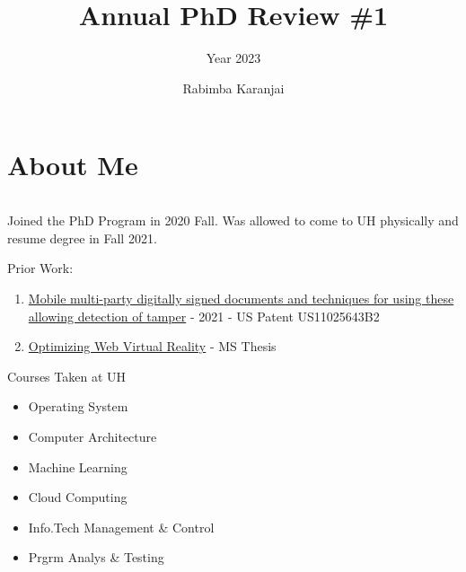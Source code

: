 \documentclass[10pt,aspectratio=169]{beamer}
\title{Annual PhD Review \#1}
\subtitle{Year 2023}
\author{Rabimba Karanjai}
\begin{document}
\maketitle

\section[fragile]{About Me}
\begin{frame}
\begin{columns}
\begin{column}{0.7\textwidth}
Joined the PhD Program in 2020 Fall. Was allowed to come to UH physically and resume degree in Fall 2021.
\begin{block}{Prior Work:}
\begin{enumerate}
\item \href{https://patents.google.com/patent/US11025643B2/en?q=(rabimba)&oq=rabimba}{Mobile multi-party digitally signed documents and techniques for using these allowing detection of tamper} - {2021} - {US Patent US11025643B2}
\item \href{https://scholarship.rice.edu/handle/1911/105623}{Optimizing Web Virtual Reality} - {MS Thesis}
\end{enumerate}
\end{block}
\begin{block}{Courses Taken at UH}
\begin{itemize}
\item Operating System
\item Computer Architecture
\item Machine Learning
\item Cloud Computing
\item Info.Tech Management \& Control
\item Prgrm Analys \& Testing
\end{itemize}
\end{block}


\end{column}
\end{columns}
\end{frame}
\end{document}
